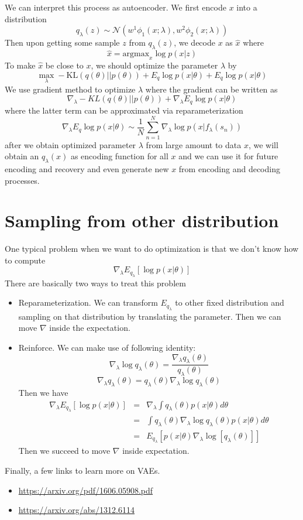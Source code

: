 \documentclass{article}
\begin{document}
We can interpret this process as autoencoder. We first encode $x$ into a distribution $$q_{\lambda}(z) \sim \mathcal{N}(w^1\phi_1(x; \lambda), w^2\phi_2(x; \lambda))$$
Then upon getting some sample $z$ from $q_\lambda(z)$, we decode $x$ as $\hat{x}$ where
$$ \hat{x} = \textrm{argmax}_{x}\log p(x|z) $$
To make $\hat{x}$ be close to $x$, we should optimize the parameter $\lambda$ by
$$ \max_\lambda -\textrm{KL}(q(\theta) || p(\theta)) + E_q\log p(x|\theta) + E_q \log p(x|\theta)$$
We use gradient method to optimize $\lambda$ where the gradient can be written as
$$ \nabla_{\lambda} -KL(q(\theta) || p(\theta)) + \nabla_{\lambda} E_q\log p(x|\theta) $$
where the latter term can be approximated via reparameterization
$$ \nabla_{\lambda} E_q\log p(x | \theta) \sim \frac{1}{N}\sum_{n=1}^N\nabla_{\lambda} \log p(x | f_\lambda(s_n)) $$
after we obtain optimized parameter $\lambda$ from large amount to data $x$, we will obtain an $q_{\lambda}(x)$ as encoding function for all $x$ and we can use it for future encoding and recovery and even generate new $x$ from encoding and decoding processes. 

\section{Sampling from other distribution}
One typical problem when we want to do optimization is that we don't know how to compute 
$$ \nabla_{\lambda} E_{q_{\lambda}}[\log p(x | \theta)] $$
There are basically two ways to treat this problem
\begin{itemize}
\item Reparameterization. We can transform $E_{q_{\lambda}}$ to other fixed distribution and sampling on that distribution by translating the parameter. Then we can move $\nabla$ inside the expectation. 
\item Reinforce. We can make use of following identity:
$$ \nabla_{\lambda}\log q_{\lambda}(\theta) = \frac{\nabla_{\lambda}q_{\lambda}(\theta)}{q_{\lambda}(\theta)} $$
$$ \nabla_{\lambda}q_{\lambda}(\theta) = q_{\lambda}(\theta)\nabla_{\lambda}\log q_{\lambda}(\theta) $$
Then we have
\begin{eqnarray}
\nabla_{\lambda}E_{q_\lambda}[\log p(x | \theta)] & = & \nabla_{\lambda}\int q_{\lambda}(\theta)p(x|\theta)d\theta \\
& = & \int q_{\lambda}(\theta) \nabla_{\lambda}\log q_{\lambda}(\theta) p(x | \theta)d\theta \\
& = & E_{q_\lambda}[p(x|\theta)\nabla_\lambda \log[q_\lambda(\theta)]]
\end{eqnarray}
Then we succeed to move $\nabla$ inside expectation.
\end{itemize}

Finally, a few links to learn more on VAEs.
\begin{itemize}
    \item \url{https://arxiv.org/pdf/1606.05908.pdf}
    \item \url{https://arxiv.org/abs/1312.6114}
\end{itemize}
\end{document}
